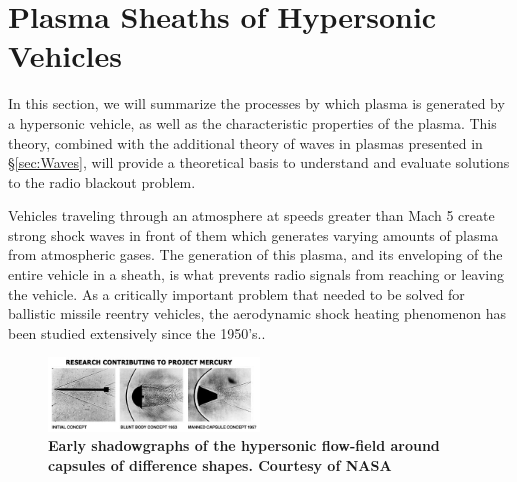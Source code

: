 \documentclass[twocolumn]{article}
\begin{document}
\section{Plasma Sheaths of Hypersonic Vehicles} \label{sec:PlasmaSheaths}
In this section, we will summarize the processes by which plasma is generated by a hypersonic vehicle, as well as the characteristic properties of the plasma.
This theory, combined with the additional theory of waves in plasmas presented in \S\ref{sec:Waves}, will provide a theoretical basis to understand and evaluate solutions to the radio blackout problem.

Vehicles traveling through an atmosphere at speeds greater than Mach 5 create strong shock waves in front of them which generates varying amounts of plasma from atmospheric gases.
The generation of this plasma, and its enveloping of the entire vehicle in a sheath, is what prevents radio signals from reaching or leaving the vehicle.
As a critically important problem that needed to be solved for ballistic missile reentry vehicles, the aerodynamic shock heating phenomenon has been studied extensively since the 1950's.\cite{allen_study_1958}\cite{dunn_theoretical_1973}\cite{allen_aerodynamic_1964}\cite{launius_coming_2012}.

\begin{figure}
	\centering
	\includegraphics[width=0.5\textwidth]{Images/Shadowgraphs.jpg}
	\caption{\textbf{Early shadowgraphs of the hypersonic flow-field around capsules of difference shapes. Courtesy of NASA}}
	\label{fig:ShadowGraphs}
\end{figure}
\end{document}
